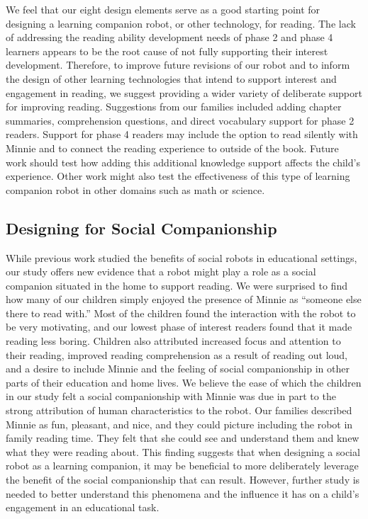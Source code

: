 \documentclass{sigchi}
\begin{document}
We feel that our eight design elements serve as a good starting point for designing a learning companion robot, or other technology, for reading. The lack of addressing the reading ability development needs of phase 2 and phase 4 learners appears to be the root cause of not fully supporting their interest development. Therefore, to improve future revisions of our robot and to inform the design of other learning technologies that intend to support interest and engagement in reading, we suggest providing a wider variety of deliberate support for improving reading. Suggestions from our families included adding chapter summaries, comprehension questions, and direct vocabulary support for phase 2 readers. Support for phase 4 readers may include the option to read silently with Minnie and to connect the reading experience to outside of the book. Future work should test how adding this additional knowledge support affects the child's experience. Other work might also test the effectiveness of this type of learning companion robot in other domains such as math or science.

\subsection{Designing for Social Companionship}
While previous work studied the benefits of social robots in educational settings, our study offers new evidence that a robot might play a role as a social companion situated in the home to support reading. We were surprised to find how many of our children simply enjoyed the presence of Minnie as ``someone else there to read with.'' Most of the children found the interaction with the robot to be very motivating, and our lowest phase of interest readers found that it made reading less boring. Children also attributed increased focus and attention to their reading, improved reading comprehension as a result of reading out loud, and a desire to include Minnie and the feeling of social companionship in other parts of their education and home lives. We believe the ease of which the children in our study felt a social companionship with Minnie was due in part to the strong attribution of human characteristics to the robot. Our families described Minnie as fun, pleasant, and nice, and they could picture including the robot in family reading time. They felt that she could see and understand them and knew what they were reading about. This finding suggests that when designing a social robot as a learning companion, it may be beneficial to more deliberately leverage the benefit of the social companionship that can result. However, further study is needed to better understand this phenomena and the influence it has on a child's engagement in an educational task.
\end{document}
